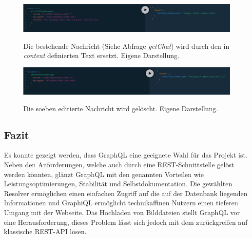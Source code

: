 \begin{figure}
	\centering
    \includegraphics[width=\textwidth]{sources/graphiql_editMessage.png}\cite{}
	\caption{Die bestehende Nachricht (Siehe Abfrage \textit{getChat}) wird durch den in \textit{content} definierten Text ersetzt. Eigene Darstellung.}
	\label{fig:gql:8}
\end{figure}

\begin{figure}
	\centering
    \includegraphics[width=\textwidth]{sources/graphiql_deleteMessage.png}\cite{}
	\caption{Die soeben editierte Nachricht wird gelöscht. Eigene Darstellung.}
	\label{fig:gql:9}
\end{figure}

\subsection*{Fazit}
Es konnte gezeigt werden, dass GraphQL eine geeignete Wahl für das Projekt ist.
Neben den Anforderungen, welche auch durch eine REST-Schnittstelle gelöst werden könnten, glänzt GraphQL mit den genannten Vorteilen wie Leistungsoptimierungen, Stabilität und Selbstdokumentation.
Die gewählten Resolver ermöglichen einen einfachen Zugriff auf die auf der Datenbank liegenden Informationen und GraphiQL ermöglicht technikaffinen Nutzern einen tieferen Umgang mit der Webseite.
Das Hochladen von Bilddateien stellt GraphQL vor eine Herausforderung, dieses Problem lässt sich jedoch mit dem zurückgreifen auf klassische REST-API lösen.